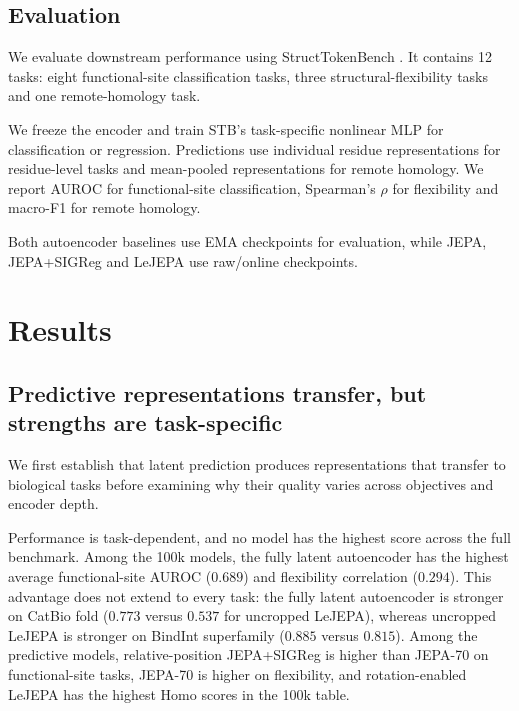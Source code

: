 \documentclass{article}
\newcommand{\aigen}[1]{\textcolor{green!50!black}{#1}}
\begin{document}
\subsection{Evaluation}
\label{sec:evaluation}

We evaluate downstream performance using StructTokenBench \citep{yuan2025protein}. It contains 12 tasks: eight functional-site classification tasks, three structural-flexibility tasks and one remote-homology task.

We freeze the encoder and train STB's task-specific nonlinear MLP for classification or regression. Predictions use individual residue representations for residue-level tasks and mean-pooled representations for remote homology. We report AUROC for functional-site classification, Spearman's $\rho$ for flexibility and macro-F1 for remote homology.

\aigen{Both autoencoder baselines use EMA checkpoints for evaluation, while JEPA, JEPA+SIGReg and LeJEPA use raw/online checkpoints.}


\section{Results}
\label{sec:results}

\subsection{Predictive representations transfer, but strengths are task-specific}

\aigen{We first establish that latent prediction produces representations that transfer to biological tasks before examining why their quality varies across objectives and encoder depth.}

Performance is task-dependent, and no model has the highest score across the full benchmark. Among the 100k models, the fully latent autoencoder has the highest average functional-site AUROC ($0.689$) and flexibility correlation ($0.294$). This advantage does not extend to every task: the fully latent autoencoder is stronger on CatBio fold ($0.773$ versus $0.537$ for uncropped LeJEPA), whereas uncropped LeJEPA is stronger on BindInt superfamily ($0.885$ versus $0.815$). Among the predictive models, relative-position JEPA+SIGReg is higher than JEPA-70 on functional-site tasks, JEPA-70 is higher on flexibility, and rotation-enabled LeJEPA has the highest Homo scores in the 100k table.
\end{document}

